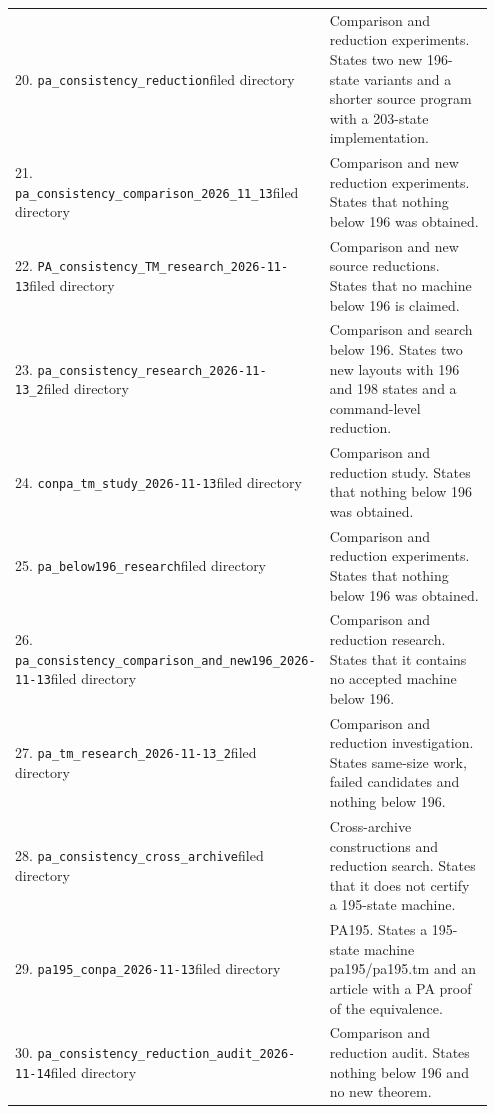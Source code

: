 \begin{longtable}{@{}p{0.43\linewidth}p{0.52\linewidth}@{}}
20. \nolinkurl{pa_consistency_reduction}\newline filed directory&Comparison and reduction experiments. States two new 196-state variants and a shorter source program with a 203-state implementation.\\[5pt]
21. \nolinkurl{pa_consistency_comparison_2026_11_13}\newline filed directory&Comparison and new reduction experiments. States that nothing below 196 was obtained.\\[5pt]
22. \nolinkurl{PA_consistency_TM_research_2026-11-13}\newline filed directory&Comparison and new source reductions. States that no machine below 196 is claimed.\\[5pt]
23. \nolinkurl{pa_consistency_research_2026-11-13_2}\newline filed directory&Comparison and search below 196. States two new layouts with 196 and 198 states and a command-level reduction.\\[5pt]
24. \nolinkurl{conpa_tm_study_2026-11-13}\newline filed directory&Comparison and reduction study. States that nothing below 196 was obtained.\\[5pt]
25. \nolinkurl{pa_below196_research}\newline filed directory&Comparison and reduction experiments. States that nothing below 196 was obtained.\\[5pt]
26. \nolinkurl{pa_consistency_comparison_and_new196_2026-11-13}\newline filed directory&Comparison and reduction research. States that it contains no accepted machine below 196.\\[5pt]
27. \nolinkurl{pa_tm_research_2026-11-13_2}\newline filed directory&Comparison and reduction investigation. States same-size work, failed candidates and nothing below 196.\\[5pt]
28. \nolinkurl{pa_consistency_cross_archive}\newline filed directory&Cross-archive constructions and reduction search. States that it does not certify a 195-state machine.\\[5pt]
29. \nolinkurl{pa195_conpa_2026-11-13}\newline filed directory&PA195. States a 195-state machine pa195/pa195.tm and an article with a PA proof of the equivalence.\\[5pt]
30. \nolinkurl{pa_consistency_reduction_audit_2026-11-14}\newline filed directory&Comparison and reduction audit. States nothing below 196 and no new theorem.\\[5pt]

\end{longtable}
